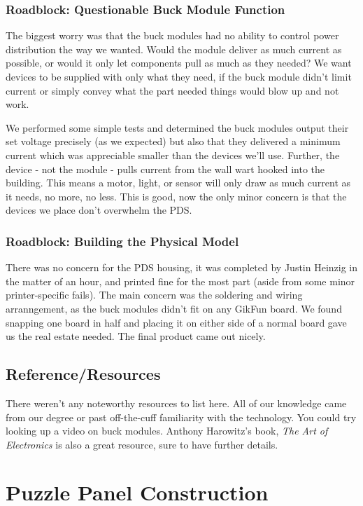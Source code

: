 \documentclass[a4paper, 10pt]{article}
\begin{document}
			\subsubsection{Roadblock: Questionable Buck Module Function}
			The biggest worry was that the buck modules had no ability to control power distribution the way we wanted. Would the module deliver as much current as possible, or would it only let components pull as much as they needed? We want devices to be supplied with only what they need, if the buck module didn't limit current or simply convey what the part needed things would blow up and not work. 
			
			We performed some simple tests and determined the buck modules output their set voltage precisely (as we expected) but also that they delivered a minimum current which was appreciable smaller than the devices we'll use. Further, the device - not the module - pulls current from the wall wart hooked into the building. This means a motor, light, or sensor will only draw as much current as it needs, no more, no less. This is good, now the only minor concern is that the devices we place don't overwhelm the PDS.
			
			\subsubsection{Roadblock: Building the Physical Model}
			There was no concern for the PDS housing, it was completed by Justin Heinzig in the matter of an hour, and printed fine for the most part (aside from some minor printer-specific fails). The main concern was the soldering and wiring arranngement, as the buck modules didn't fit on any GikFun board. We found snapping one board in half and placing it on either side of a normal board gave us the real estate needed. The final product came out nicely. 
			
		\subsection{Reference/Resources}
		There weren't any noteworthy resources to list here. All of our knowledge came from our degree or past off-the-cuff familiarity with the technology. You could try looking up a video on buck modules. Anthony Harowitz's book, \emph{The Art of Electronics} is also a great resource, sure to have further details.
		
\section{Puzzle Panel Construction}
\end{document}
